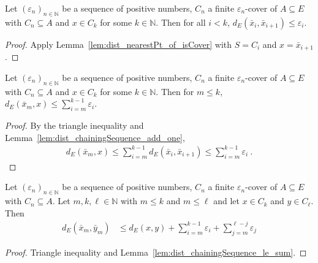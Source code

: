 \begin{lemma}\label{lem:dist_chainingSequence_add_one}
Let $(\varepsilon_n)_{n \in \mathbb{N}}$ be a sequence of positive numbers, $C_n$ a finite $\varepsilon_n$-cover of $A \subseteq E$ with $C_n \subseteq A$ and $x \in C_k$ for some $k \in \mathbb{N}$.
Then for all $i < k$, $d_E(\bar{x}_i, \bar{x}_{i+1}) \le \varepsilon_i$.
\end{lemma}

\begin{proof}
Apply Lemma~\ref{lem:dist_nearestPt_of_isCover} with $S = C_i$ and $x = \bar{x}_{i+1}$.
\end{proof}


\begin{lemma}\label{lem:dist_chainingSequence_le_sum}
Let $(\varepsilon_n)_{n \in \mathbb{N}}$ be a sequence of positive numbers, $C_n$ a finite $\varepsilon_n$-cover of $A \subseteq E$ with $C_n \subseteq A$ and $x \in C_k$ for some $k \in \mathbb{N}$.
Then for $m \le k$, $d_E(\bar{x}_m, x) \le \sum_{i=m}^{k-1} \varepsilon_i$.
\end{lemma}

\begin{proof}
By the triangle inequality and Lemma~\ref{lem:dist_chainingSequence_add_one},
\begin{align*}
  d_E(\bar{x}_m, x)
  \le \sum_{i=m}^{k-1} d_E(\bar{x}_i, \bar{x}_{i+1})
  \le \sum_{i=m}^{k-1} \varepsilon_i
  \: .
\end{align*}
\end{proof}


\begin{lemma}\label{lem:dist_chainingSequence_le}
Let $(\varepsilon_n)_{n \in \mathbb{N}}$ be a sequence of positive numbers, $C_n$ a finite $\varepsilon_n$-cover of $A \subseteq E$ with $C_n \subseteq A$.
Let $m, k, \ell \in \mathbb{N}$ with $m \le k$ and $m \le \ell$ and let $x \in C_k$ and $y \in C_\ell$.
Then
\begin{align*}
  d_E(\bar{x}_m, \bar{y}_m)
  &\le d_E(x, y) + \sum_{i=m}^{k-1} \varepsilon_i + \sum_{j=m}^{\ell-j} \varepsilon_j
\end{align*}
\end{lemma}

\begin{proof}
Triangle inequality and Lemma~\ref{lem:dist_chainingSequence_le_sum}.
\end{proof}


